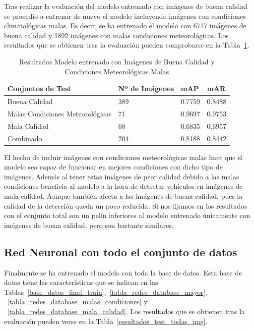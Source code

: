 Tras realizar la evaluación del modelo entrenado con imágenes de buena calidad se procedio a entrenar de nuevo el modelo incluyendo imágenes con condiciones climatológicas malas. Es decir, se ha entrenado el modelo con 6717 imágenes de buena calidad y 1892 imágenes con malas condiciones meteorológicas. Los resultados que se obtienen tras la evaluación pueden comprobarse en la Tabla~\ref{resultados_test_buenas_malas_condiciones}.

\begin{table}[htbp]
\begin{center}
\begin{tabular}{|l|l|l|l|}
\hline
 Conjuntos de Test & Nº de Imágenes & mAP & mAR  \\ 
\hline \hline
Buena Calidad & 389 & 0.7759 & 0.8488 \\ \hline
Malas Condiciones Meteorológicas & 71 & 0.9697 & 0.9753 \\ \hline
Mala Calidad  & 68 & 0.6835 & 0.6957\\ \hline
Combinado & 204 & 0.8188 & 0.8442\\ \hline
\end{tabular}
\caption{Resultados Modelo entrenado con Imágenes de Buena Calidad y Condiciones Meteorológicas Malas}
\label{resultados_test_buenas_malas_condiciones}
\end{center}
\end{table}

El hecho de incluir imágenes con condiciones meteorológicas malas hace que el modelo sea capaz de funcionar en mejores condiciones con dicho tipo de imágenes. Además al tener estas imágenes de peor calidad debido a las malas condiciones beneficia al modelo a la hora de detectar vehículos en imágenes de mala calidad. Aunque también afecta a las imágenes de buena calidad, pues la calidad de la detección queda un poco reducida. Si nos fijamos en los resultados con el conjunto total son un pelín inferiores al modelo entrenado únicamente con imágenes de buena calidad, pero son bastante similares.


\subsection{Red Neuronal con todo el conjunto de datos}

Finalmente se ha entrenado el modelo con toda la base de datos. Esta base de datos tiene las características que se indican en las Tablas~\ref{base_datos_final_train},~\ref{tabla_redes_database_mayor}, ~\ref{tabla_redes_database_malas_condiciones} y ~\ref{tabla_redes_database_mala_calidad}. Los resultados que se obtienen tras la evaluación pueden verse en la Tabla~\ref{resultados_test_todas_img}.

